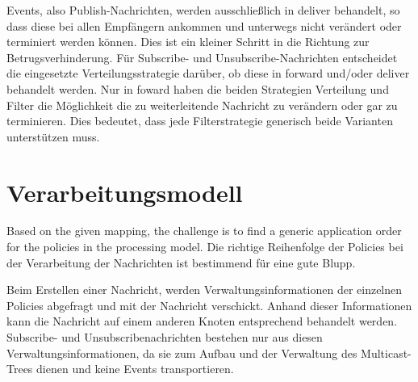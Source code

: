 \begin{table}[!h]
\caption{Verbindungsmatrix}
\label{tab:verbindungsmatrix}
\end{table}

Events, also Publish-Nachrichten, werden ausschließlich in deliver behandelt, so dass diese bei allen Empfängern ankommen und unterwegs nicht verändert oder terminiert werden können. Dies ist ein kleiner Schritt in die Richtung zur Betrugsverhinderung. Für Subscribe- und Unsubscribe-Nachrichten entscheidet die eingesetzte Verteilungsstrategie darüber, ob diese in forward und/oder deliver behandelt werden. Nur in foward haben die beiden Strategien Verteilung und Filter die Möglichkeit die zu weiterleitende Nachricht zu verändern oder gar zu terminieren. Dies bedeutet, dass jede Filterstrategie generisch beide Varianten unterstützen muss.


\section{Verarbeitungsmodell}
Based on the given mapping, the challenge is to find a generic application order for the policies in the processing model.
Die richtige Reihenfolge der Policies bei der Verarbeitung der Nachrichten ist bestimmend für eine gute Blupp.

Beim Erstellen einer Nachricht, werden Verwaltungsinformationen der einzelnen Policies abgefragt und mit der Nachricht verschickt. Anhand dieser Informationen kann die Nachricht auf einem anderen Knoten entsprechend behandelt werden. Subscribe- und Unsubscribenachrichten bestehen nur aus diesen Verwaltungsinformationen, da sie zum Aufbau und der Verwaltung des Multicast-Trees dienen und keine Events transportieren.

